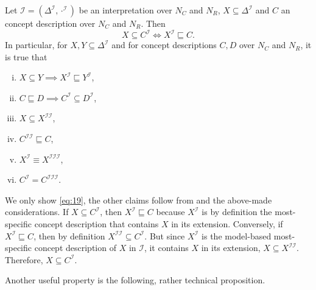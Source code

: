 \begin{Lemma}
  \label{lem:mmsc-and-extension-are-galois-connection}
  Let $\mathcal{I} = (\Delta^{\mathcal{I}}, \cdot^{\mathcal{I}})$ be an interpretation
  over $N_C$ and $N_R$, $X \subseteq \Delta^{\mathcal{I}}$ and $C$ an \ELgfpbot concept
  description over $N_C$ and $N_R$.  Then
  \begin{equation}
    \label{eq:19}
    X \subseteq C^{\mathcal{I}} \iff X^{\mathcal{I}} \sqsubseteq C.
  \end{equation}
  In particular, for $X, Y \subseteq \Delta^{\mathcal{I}}$ and for \ELgfpbot concept
  descriptions $C, D$ over $N_C$ and $N_R$, it is true that
  \begin{enumerate}[i. ]
  \item $X \subseteq Y \implies X^{\mathcal{I}} \sqsubseteq Y^{\mathcal{I}}$,
  \item $C \sqsubseteq D \implies C^{\mathcal{I}} \subseteq D^{\mathcal{I}}$,
  \item $X \subseteq X^{\mathcal{I}\mathcal{I}}$,
  \item $C^{\mathcal{I}\mathcal{I}} \sqsubseteq C$,
  \item $X^{\mathcal{I}} \equiv X^{\mathcal{I}\mathcal{I}\mathcal{I}}$,
  \item $C^{\mathcal{I}} = C^{\mathcal{I}\mathcal{I}\mathcal{I}}$.
  \end{enumerate}
\end{Lemma}
\begin{Proof}
  We only show \eqref{eq:19}, the other claims follow from
   and the above-made considerations.  If $X
  \subseteq C^{\mathcal{I}}$, then $X^{\mathcal{I}} \sqsubseteq C$ because
  $X^{\mathcal{I}}$ is by definition the most-specific concept description that contains
  $X$ in its extension.  Conversely, if $X^{\mathcal{I}} \sqsubseteq C$, then by
  definition $X^{\mathcal{I}\mathcal{I}} \subseteq C^{\mathcal{I}}$.  But since
  $X^{\mathcal{I}}$ is the model-based most-specific concept description of $X$ in
  $\mathcal{I}$, it contains $X$ in its extension, \ie $X \subseteq
  X^{\mathcal{I}\mathcal{I}}$.  Therefore, $X \subseteq C^{\mathcal{I}}$.
\end{Proof}

Another useful property is the following, rather technical proposition.

